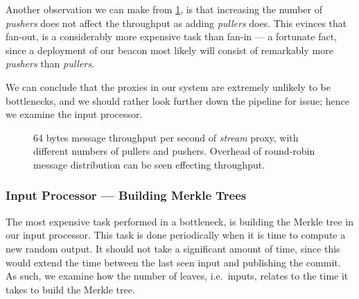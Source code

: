 Another observation we can make from \cref{fig:proxy_throughput}, is that increasing the number of \textit{pushers} does not affect the throughput as adding \textit{pullers} does.
This evinces that fan-out, is a considerably more expensive task than fan-in --- a fortunate fact, since a deployment of our beacon most likely will consist of remarkably more \textit{pushers} than \textit{pullers}.

We can conclude that the proxies in our system are extremely unlikely to be bottlenecks, and we should rather look further down the pipeline for issue; hence we examine the input processor.

\begin{figure}
    \centering
    \footnotesize
    \caption{%
        64 bytes message throughput per second of \textit{stream} proxy, with different numbers of pullers and pushers.
Overhead of round-robin message distribution can be seen effecting throughput.}%
    \label{fig:proxy_throughput}
\end{figure}

\subsubsection{Input Processor --- Building Merkle Trees}%
\label{ssub:input_processor_building_merkle_trees}
The most expensive task performed in a bottleneck, is building the Merkle tree in our input processor.
This task is done periodically when it is time to compute a new random output.
It should not take a significant amount of time, since this would extend the time between the last seen input and publishing the commit.
As such, we examine how the number of leaves, i.e.\ inputs, relates to the time it takes to build the Merkle tree.

